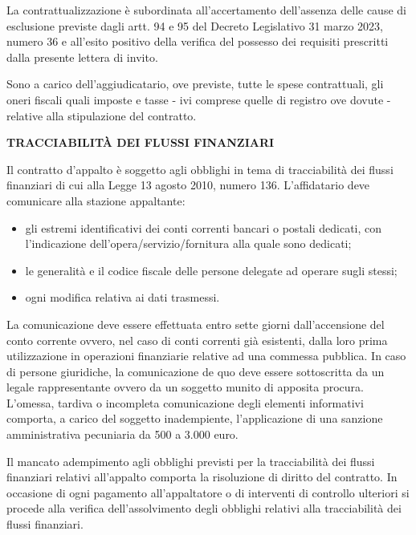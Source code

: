 La contrattualizzazione è subordinata all'accertamento dell'assenza
delle cause di esclusione previste dagli artt. 94 e 95 del Decreto
Legislativo 31 marzo 2023, numero 36 e all'esito positivo della verifica
del possesso dei requisiti prescritti dalla presente lettera di invito.

Sono a carico dell'aggiudicatario, ove previste, tutte le spese
contrattuali, gli oneri fiscali quali imposte e tasse - ivi comprese
quelle di registro ove dovute - relative alla stipulazione del contratto.

\textbf{TRACCIABILITÀ DEI FLUSSI FINANZIARI}

Il contratto d'appalto è soggetto agli obblighi in tema di
tracciabilità dei flussi finanziari di cui alla Legge 13 agosto 2010,
numero 136. L'affidatario deve comunicare alla stazione appaltante:

\begin{itemize}

\item gli estremi identificativi dei conti correnti bancari o postali
dedicati, con l'indicazione dell'opera/servizio/fornitura alla quale
sono dedicati;

\item le generalità e il codice fiscale delle persone delegate ad
operare sugli stessi;

\item ogni modifica relativa ai dati trasmessi. 
\end{itemize}

La comunicazione deve essere effettuata entro sette giorni dall'accensione
del conto corrente ovvero, nel caso di conti correnti già esistenti,
dalla loro prima utilizzazione in operazioni finanziarie relative ad
una commessa pubblica. In caso di persone giuridiche, la comunicazione
de quo deve essere sottoscritta da un legale rappresentante ovvero da
un soggetto munito di apposita procura. L'omessa, tardiva o incompleta
comunicazione degli elementi informativi comporta, a carico del soggetto
inadempiente, l'applicazione di una sanzione amministrativa pecuniaria
da 500 a 3.000 euro.

Il mancato adempimento agli obblighi previsti per la tracciabilità
dei flussi finanziari relativi all'appalto comporta la risoluzione di
diritto del contratto. In occasione di ogni pagamento all'appaltatore
o di interventi di controllo ulteriori si procede alla verifica
dell'assolvimento degli obblighi relativi alla tracciabilità dei
flussi finanziari.

